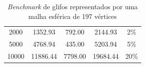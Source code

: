 \documentclass[
    12pt,                %
    oneside,            %
    a4paper,            %
    english,            %
    french,                %
    spanish,            %
    brazil                %
    ]{abntex2}
\begin{document}
\begin{table}[H]
\begin{tabular}{c|c|c|c|c}
2000                                                                     & 1352.93                                                                                                & 792.00                                                               & 2144.93                                                                        & 2\%                                                                                               \\
5000                                                                     & 4768.94                                                                                                & 435.00                                                               & 5203.94                                                                        & 5\%                                                                                               \\
10000                                                                    & 11886.44                                                                                               & 7798.00                                                              & 19684.44                                                                       & 20\%                                                                                             
\end{tabular}
\caption{\textit{Benchmark} de glifos representados por uma malha esférica de 197 vértices}
\label{tab::benchmark_glifos_197}
\end{table}
\end{document}
